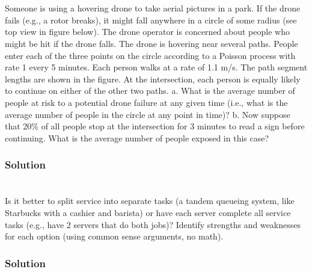 \documentclass{amsart}
\begin{document}
\section{} %
Someone is using a hovering drone to take aerial pictures in a park. If the drone fails
(e.g., a rotor breaks), it might fall anywhere in a circle of some radius (see top view in
figure below). The drone operator is concerned about people who might be hit if the
drone falls. The drone is hovering near several paths. People enter each of the three
points on the circle according to a Poisson process with rate 1 every 5 minutes. Each
person walks at a rate of 1.1 m/s. The path segment lengths are shown in the figure. At
the intersection, each person is equally likely to continue on either of the other two paths.
a. What is the average number of people at risk to a potential drone failure at any given
time (i.e., what is the average number of people in the circle at any point in time)?
b. Now suppose that 20\% of all people stop at the intersection for 3 minutes to read a
sign before continuing. What is the average number of people exposed in this case?
\subsubsection*{Solution}
\section{} %
Is it better to split service into separate tasks (a tandem queueing system, like Starbucks
with a cashier and barista) or have each server complete all service tasks (e.g., have 2
servers that do both jobs)? Identify strengths and weaknesses for each option (using
common sense arguments, no math).
\subsubsection*{Solution}
\end{document}
